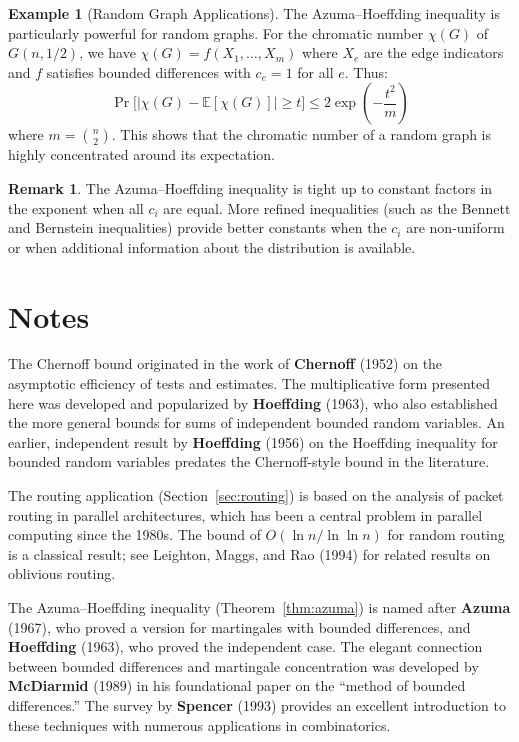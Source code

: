 \documentclass[twoside,12pt]{book}
\theoremstyle{plain}
\theoremstyle{definition}
\newtheorem{example}[theorem]{Example}
\newtheorem{remark}[theorem]{Remark}
\theoremstyle{remark}
\begin{document}
\begin{example}[Random Graph Applications]
\label{ex:graph-azuma}
The Azuma--Hoeffding inequality is particularly powerful for random
graphs. For the chromatic number $\chi(G)$ of $G(n, 1/2)$, we have
$\chi(G) = f(X_1, \ldots, X_m)$ where $X_e$ are the edge indicators and
$f$ satisfies bounded differences with $c_e = 1$ for all $e$. Thus:
\[
\Pr\!\bigl[|\chi(G) - \mathbb{E}[\chi(G)]| \geq t\bigr]
\leq 2\exp\!\left(-\frac{t^2}{m}\right)
\]
where $m = \binom{n}{2}$. This shows that the chromatic number of a
random graph is highly concentrated around its expectation.
\end{example}

\begin{remark}
The Azuma--Hoeffding inequality is tight up to constant factors in the
exponent when all $c_i$ are equal. More refined inequalities (such as the
Bennett and Bernstein inequalities) provide better constants when the
$c_i$ are non-uniform or when additional information about the
distribution is available.
\end{remark}

\section*{Notes}

The Chernoff bound originated in the work of \textbf{Chernoff} (1952) on
the asymptotic efficiency of tests and estimates. The multiplicative form
presented here was developed and popularized by
\textbf{Hoeffding} (1963), who also established the more general bounds
for sums of independent bounded random variables. An earlier, independent
result by \textbf{Hoeffding} (1956) on the Hoeffding inequality for
bounded random variables predates the Chernoff-style bound in the
literature.

The routing application (Section~\ref{sec:routing}) is based on the
analysis of packet routing in parallel architectures, which has been a
central problem in parallel computing since the 1980s. The bound of
$O(\ln n / \ln \ln n)$ for random routing is a classical result; see
Leighton, Maggs, and Rao (1994) for related results on oblivious routing.

The Azuma--Hoeffding inequality (Theorem~\ref{thm:azuma}) is named after
\textbf{Azuma} (1967), who proved a version for martingales with bounded
differences, and \textbf{Hoeffding} (1963), who proved the independent
case. The elegant connection between bounded differences and martingale
concentration was developed by \textbf{McDiarmid} (1989) in his
foundational paper on the ``method of bounded differences.'' The survey by
\textbf{Spencer} (1993) provides an excellent introduction to these
techniques with numerous applications in combinatorics.
\end{document}
